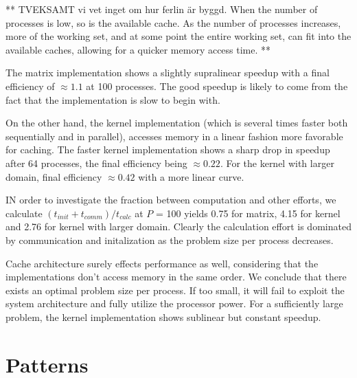 \documentclass[a4paper,11pt]{article}
\begin{document}
** TVEKSAMT vi vet inget om hur ferlin är byggd. When the number of processes is low, so is the available cache.  As the number of processes increases, more of the working set, and at some point the entire working set, can fit into the available caches, allowing for a quicker memory access time. **

The matrix implementation shows a slightly supralinear speedup with a final efficiency of $\approx1.1$ at 100 processes. The good speedup is likely to come from the fact that the implementation is slow to begin with.

On the other hand, the kernel implementation (which is several times faster both sequentially and in parallel), accesses memory in a linear fashion more favorable for caching. The faster kernel implementation shows a sharp drop in speedup after 64 processes, the final efficiency being $\approx0.22$. For the kernel with larger domain, final efficiency $\approx0.42$ with a more linear curve.

IN order to investigate the fraction between computation and other efforts, we calculate $(t_{init}+t_{comm})/t_{calc}$ at $P$ = 100 yields 0.75 for matrix, 4.15 for kernel and 2.76 for kernel with larger domain. Clearly the calculation effort is dominated by communication and initalization as the problem size per process decreases. 

Cache architecture surely effects performance as well, considering that the implementations don't access memory in the same order. We conclude that there exists an optimal problem size per process. If too small, it will fail to exploit the system architecture and fully utilize the processor power. For a sufficiently large problem, the kernel implementation shows sublinear but constant speedup.

\section*{Patterns}
\end{document}
